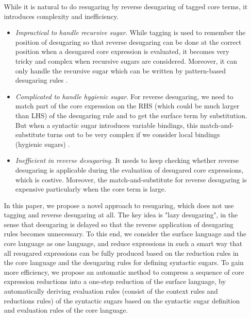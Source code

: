 While it is natural to do resugaring by reverse desugaring of tagged core terms, it introduces complexity and inefficiency.
\begin{itemize}
\item {\em Impractical to handle recursive sugar}. While tagging is used to remember the position of desugaring so that reverse desugaring can be done at the correct position when a desugared core expression is evaluated, it  becomes very tricky and complex when recursive sugars are considered. Moreover, it can only handle the recursive sugar which can be written by pattern-based desugaring rules \cite{resugaring}.%

\item {\em Complicated to handle hygienic sugar}. For reverse desugaring, we need to match part of the core expression on the RHS (which could be much larger than LHS) of the desugaring rule and to get the surface term by substitution. But when a syntactic sugar introduces variable bindings, this match-and-substitute turns out to be very complex if we consider local bindings (hygienic sugars) \cite{hygienic}.

\item {\em Inefficient in reverse desugaring.} It needs to keep checking whether reverse desugaring is applicable during the evaluation of desugared core expressions, which is costive. Moreover, the match-and-substitute for reverse desugaring is expensive particularly when the core term is large.

\end{itemize}

In this paper, we propose a novel approach to resugaring, which does not use tagging and reverse desugaring at all.
The key idea is "lazy desugaring", in the sense that desugaring is delayed so that the reverse application of desugaring rules becomes unnecessary.
To this end, we consider the surface language and the core language as one language, and reduce expressions in such a smart way that all resugared expressions can be fully produced based on the reduction rules in the core language and  the desugaring rules for defining syntactic sugars. To gain more efficiency, we propose an automatic method to compress a sequence of core expression reductions into a one-step reduction of the surface language, by automatically deriving evaluation rules (consist of the context rules and reductions rules)  of the syntactic sugars based on the syntactic sugar definition and evaluation rules of the core language.


